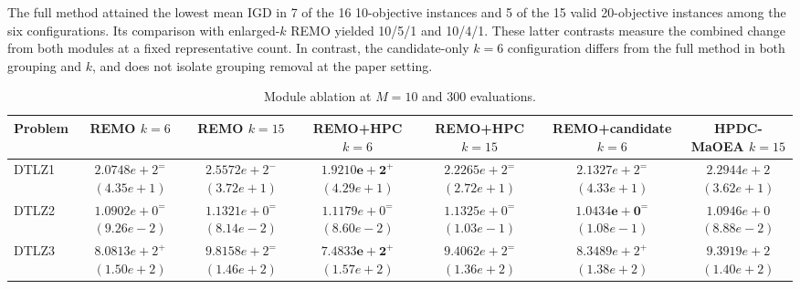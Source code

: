 The full method attained the lowest mean IGD in 7 of the 16
10-objective instances and 5 of the 15 valid 20-objective instances among
the six configurations. Its comparison with enlarged-$k$ REMO yielded
10/5/1 and 10/4/1. These latter contrasts measure the combined change
from both modules at a fixed representative count. In contrast, the
candidate-only $k=6$ configuration differs from the full method in both
grouping and $k$, and does not isolate grouping removal at the paper
setting.

\begin{table}[t]
\centering
\caption{Module ablation at $M=10$ and 300 evaluations.}
\label{tab:exp:abl10}
\scriptsize
\setlength{\tabcolsep}{4pt}
\renewcommand{\arraystretch}{1.12}
\begin{tabular}{lcccccc}
\toprule
Problem & \shortstack{REMO\\$k=6$} & \shortstack{REMO\\$k=15$} & \shortstack{REMO+HPC\\$k=6$} & \shortstack{REMO+HPC\\$k=15$} & \shortstack{REMO+candidate\\$k=6$} & \shortstack{HPDC-MaOEA\\$k=15$} \\
\midrule
DTLZ1 & \shortstack{$2.0748e+2^{=}$\\$(4.35e+1)$} & \shortstack{$2.5572e+2^{-}$\\$(3.72e+1)$} & \shortstack{$\mathbf{1.9210e+2}^{+}$\\$(4.29e+1)$} & \shortstack{$2.2265e+2^{=}$\\$(2.72e+1)$} & \shortstack{$2.1327e+2^{=}$\\$(4.33e+1)$} & \shortstack{$2.2944e+2$\\$(3.62e+1)$} \\
DTLZ2 & \shortstack{$1.0902e+0^{=}$\\$(9.26e-2)$} & \shortstack{$1.1321e+0^{=}$\\$(8.14e-2)$} & \shortstack{$1.1179e+0^{=}$\\$(8.60e-2)$} & \shortstack{$1.1325e+0^{=}$\\$(1.03e-1)$} & \shortstack{$\mathbf{1.0434e+0}^{=}$\\$(1.08e-1)$} & \shortstack{$1.0946e+0$\\$(8.88e-2)$} \\
DTLZ3 & \shortstack{$8.0813e+2^{+}$\\$(1.50e+2)$} & \shortstack{$9.8158e+2^{=}$\\$(1.46e+2)$} & \shortstack{$\mathbf{7.4833e+2}^{+}$\\$(1.57e+2)$} & \shortstack{$9.4062e+2^{=}$\\$(1.36e+2)$} & \shortstack{$8.3489e+2^{+}$\\$(1.38e+2)$} & \shortstack{$9.3919e+2$\\$(1.40e+2)$} \\

\end{tabular}
\end{table}
